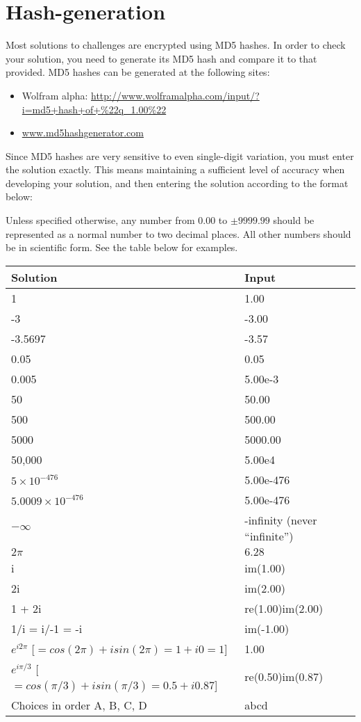 \newpage
\section{Hash-generation}
\label{sec:hashes}

Most solutions to challenges are encrypted using MD5 hashes. In order to check your solution, you need to generate its MD5 hash and compare it to that provided.  MD5 hashes can be generated at the following sites:

\begin{itemize}
    \item Wolfram alpha: \url{http://www.wolframalpha.com/input/?i=md5+hash+of+\%22q_1.00\%22}
    \item \url{www.md5hashgenerator.com}
\end{itemize}

Since MD5 hashes are very sensitive to even single-digit variation, you must enter the solution exactly. This means maintaining a sufficient level of accuracy when developing your solution, and then entering the solution according to the format below:

Unless specified otherwise, any number from $0.00$ to $\pm 9999.99$ should be represented as a normal number to two decimal places. All other numbers should be in scientific form. See the table below for examples.

\begin{center}
\begin{tabular}{|l|l|}
    \hline
    \textbf{Solution} & \textbf{Input} \\ \hline
    1 & 1.00 \\
    -3 & -3.00 \\
    -3.5697 & -3.57 \\
    0.05 & 0.05 \\
    0.005 & 5.00e-3 \\
    50 & 50.00 \\
    500 & 500.00 \\
    5000 & 5000.00 \\
    50,000 & 5.00e4 \\
    $5 \times 10^{-476}$ & 5.00e-476 \\
    $5.0009 \times 10^{-476}$ & 5.00e-476 \\
    $-\infty$ & -infinity (never ``infinite'')\\
    $2 \pi$ & $6.28$ \\
    i & im(1.00) \\
    2i & im(2.00) \\
    1 + 2i & re(1.00)im(2.00) \\
    1/i = i/-1 = -i & im(-1.00) \\
    $e^{i2\pi}$ [$= cos(2 \pi) + isin(2 \pi) = 1 + i0 = 1$] & 1.00 \\
    $e^{i\pi/3}$ [$= cos(\pi/3) + isin(\pi/3) = 0.5 + i 0.87$] & re(0.50)im(0.87) \\
    Choices in order A, B, C, D & abcd \\
    \hline
\end{tabular}
\end{center}

